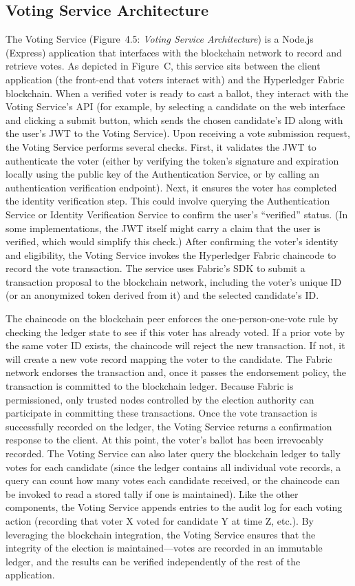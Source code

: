 \documentclass[a4paper,10pt]{report}
\begin{document}
\subsection{Voting Service Architecture}
The Voting Service (Figure~4.5: \emph{Voting Service Architecture}) is a Node.js (Express) application that interfaces with the blockchain network to record and retrieve votes. As depicted in Figure~C, this service sits between the client application (the front-end that voters interact with) and the Hyperledger Fabric blockchain. When a verified voter is ready to cast a ballot, they interact with the Voting Service’s API (for example, by selecting a candidate on the web interface and clicking a submit button, which sends the chosen candidate’s ID along with the user’s JWT to the Voting Service). Upon receiving a vote submission request, the Voting Service performs several checks. First, it validates the JWT to authenticate the voter (either by verifying the token’s signature and expiration locally using the public key of the Authentication Service, or by calling an authentication verification endpoint). Next, it ensures the voter has completed the identity verification step. This could involve querying the Authentication Service or Identity Verification Service to confirm the user’s “verified” status. (In some implementations, the JWT itself might carry a claim that the user is verified, which would simplify this check.) After confirming the voter’s identity and eligibility, the Voting Service invokes the Hyperledger Fabric chaincode to record the vote transaction. The service uses Fabric’s SDK to submit a transaction proposal to the blockchain network, including the voter’s unique ID (or an anonymized token derived from it) and the selected candidate’s ID.

The chaincode on the blockchain peer enforces the one-person-one-vote rule by checking the ledger state to see if this voter has already voted. If a prior vote by the same voter ID exists, the chaincode will reject the new transaction. If not, it will create a new vote record mapping the voter to the candidate. The Fabric network endorses the transaction and, once it passes the endorsement policy, the transaction is committed to the blockchain ledger. Because Fabric is permissioned, only trusted nodes controlled by the election authority can participate in committing these transactions. Once the vote transaction is successfully recorded on the ledger, the Voting Service returns a confirmation response to the client. At this point, the voter’s ballot has been irrevocably recorded. The Voting Service can also later query the blockchain ledger to tally votes for each candidate (since the ledger contains all individual vote records, a query can count how many votes each candidate received, or the chaincode can be invoked to read a stored tally if one is maintained). Like the other components, the Voting Service appends entries to the audit log for each voting action (recording that voter X voted for candidate Y at time Z, etc.). By leveraging the blockchain integration, the Voting Service ensures that the integrity of the election is maintained—votes are recorded in an immutable ledger, and the results can be verified independently of the rest of the application.
\end{document}
